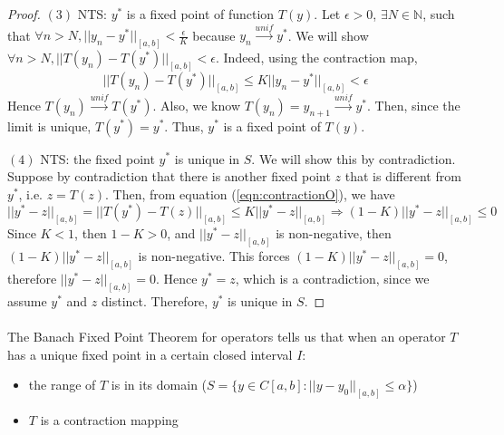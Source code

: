 \documentclass{article}
\theoremstyle{definition}
\theoremstyle{remark}
\theoremstyle{example}
\begin{document}
\begin{proof}
    $(3)$ NTS: $y^{*}$ is a fixed point of function $T(y)$. \; Let $\epsilon > 0$, $\exists N \in \mathbb{N}$, such that $\forall n > N, \lvert\lvert y_n - y^{*} \rvert\rvert_{[a,b]} < \tfrac{\epsilon}{K}$ because $y_n \xrightarrow{unif} y^{*}$. We will show $\forall n > N, \lvert\lvert T(y_n) - T(y^{*}) \rvert\rvert_{[a,b]} < \epsilon$. Indeed, using the contraction map,
    \begin{equation}
        \lvert\lvert T(y_n) - T(y^{*}) \rvert\rvert_{[a,b]} \leq K \lvert\lvert y_n - y^{*} \rvert\rvert_{[a,b]} < \epsilon
    \end{equation}
    Hence $T(y_n) \xrightarrow{unif} T(y^{*})$. Also, we know $T(y_n) = y_{n+1} \xrightarrow{unif} y^{*}$. Then, since the limit is unique, $T(y^{*}) = y^{*}$. Thus, $y^{*}$ is a fixed point of $T(y)$.
    
    $(4)$ NTS: the fixed point $y^{*}$ is unique in $S$. \; We will show this by contradiction. Suppose by contradiction that there is another fixed point $z$ that is different from $y^{*}$, i.e. $z = T(z)$. Then, from equation (\ref{eqn:contractionO}), we have
    \begin{equation}
        \lvert\lvert y^{*} - z \rvert\rvert_{[a,b]} =\lvert\lvert T(y^{*}) - T(z) \rvert\rvert_{[a,b]} \leq K \lvert\lvert y^{*} - z \rvert\rvert_{[a,b]} \Rightarrow (1-K)\lvert\lvert y^{*} - z \rvert\rvert_{[a,b]} \leq 0
    \end{equation}
    Since $K < 1$, then $1 - K > 0$, and $\lvert\lvert y^{*} - z \rvert\rvert_{[a,b]}$ is non-negative, then $(1-K)\lvert\lvert y^{*} - z \rvert\rvert_{[a,b]}$ is non-negative. This forces $(1-K)\lvert\lvert y^{*} - z \rvert\rvert_{[a,b]} = 0$, therefore $\lvert\lvert y^{*} - z\rvert\rvert_{[a,b]} = 0$. Hence $y^{*} = z$, which is a contradiction, since we assume $y^{*}$ and $z$ distinct. Therefore, $y^{*}$ is unique in $S$.
\end{proof}

\paragraph{   }

The Banach Fixed Point Theorem for operators tells us that when an operator $T$ has a unique fixed point in a certain closed interval $I$:
\begin{itemize}
    \item the range of $T$ is in its domain ($S = \{y\in C[a,b]:\lvert\lvert y - y_0\rvert\rvert_{[a,b]} \leq \alpha\}$)
    \item $T$ is a contraction mapping
\end{itemize}
\end{document}
